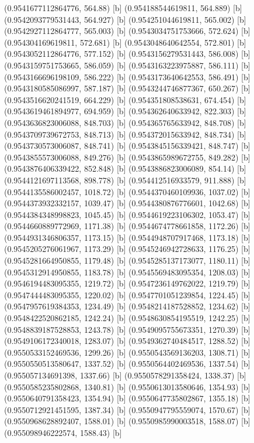 {{{(0.9541677112864776, 564.88) [b] 
(0.954188544619811, 564.889) [b] 
(0.9542093779531443, 564.927) [b] 
(0.954251044619811, 565.002) [b] 
(0.9542927112864777, 565.003) [b] 
(0.9543034751753666, 572.624) [b] 
(0.954304169619811, 572.681) [b] 
(0.9543048640642554, 572.801) [b] 
(0.9543052112864776, 577.152) [b] 
(0.9543156279531443, 586.008) [b] 
(0.9543159751753665, 586.059) [b] 
(0.9543163223975887, 586.111) [b] 
(0.9543166696198109, 586.222) [b] 
(0.9543173640642553, 586.491) [b] 
(0.9543180585086997, 587.187) [b] 
(0.9543244746877367, 650.267) [b] 
(0.9543516620241519, 664.229) [b] 
(0.954351808538631, 674.454) [b] 
(0.9543619461894977, 694.959) [b] 
(0.954362640633942, 822.303) [b] 
(0.9543636823006088, 848.703) [b] 
(0.954365765633942, 848.708) [b] 
(0.9543709739672753, 848.713) [b] 
(0.954372015633942, 848.734) [b] 
(0.9543730573006087, 848.741) [b] 
(0.9543845156339421, 848.747) [b] 
(0.9543855573006088, 849.276) [b] 
(0.9543865989672755, 849.282) [b] 
(0.9543876406339422, 852.848) [b] 
(0.9543886823006089, 854.14) [b] 
(0.9544121697113568, 898.778) [b] 
(0.954412516933579, 911.888) [b] 
(0.9544135586002457, 1018.72) [b] 
(0.9544370460109936, 1037.02) [b] 
(0.9544373932332157, 1039.47) [b] 
(0.9544380876776601, 1042.68) [b] 
(0.9544384348998823, 1045.45) [b] 
(0.9544619223106302, 1053.47) [b] 
(0.9544660889772969, 1171.38) [b] 
(0.9544674778661858, 1172.26) [b] 
(0.9544931346806357, 1173.15) [b] 
(0.9544948707917468, 1173.18) [b] 
(0.9545205276061967, 1173.29) [b] 
(0.9545246942728633, 1176.25) [b] 
(0.9545281664950855, 1179.48) [b] 
(0.9545285137173077, 1180.11) [b] 
(0.9545312914950855, 1183.78) [b] 
(0.9545569483095354, 1208.03) [b] 
(0.9546194483095355, 1219.72) [b] 
(0.9547236149762022, 1219.79) [b] 
(0.9547444483095355, 1220.02) [b] 
(0.9547701051239854, 1224.45) [b] 
(0.9547957619384353, 1234.49) [b] 
(0.9548214187528852, 1234.62) [b] 
(0.9548422520862185, 1242.24) [b] 
(0.9548630854195519, 1242.25) [b] 
(0.9548839187528853, 1243.78) [b] 
(0.9549095755673351, 1270.39) [b] 
(0.9549106172340018, 1283.07) [b] 
(0.9549362740484517, 1288.52) [b] 
(0.9550533152469536, 1299.26) [b] 
(0.9550543569136203, 1308.71) [b] 
(0.9550550513580647, 1337.52) [b] 
(0.9550564402469536, 1337.54) [b] 
(0.955057134691398, 1337.66) [b] 
(0.9550578291358424, 1338.37) [b] 
(0.9550585235802868, 1340.81) [b] 
(0.9550613013580646, 1354.93) [b] 
(0.9550640791358423, 1354.94) [b] 
(0.9550647735802867, 1355.18) [b] 
(0.9550712921451595, 1387.34) [b] 
(0.9550947795559074, 1570.67) [b] 
(0.9550968628892407, 1588.01) [b] 
(0.9550985990003518, 1588.07) [b] 
(0.955098946222574, 1588.43) [b] 
}}}
